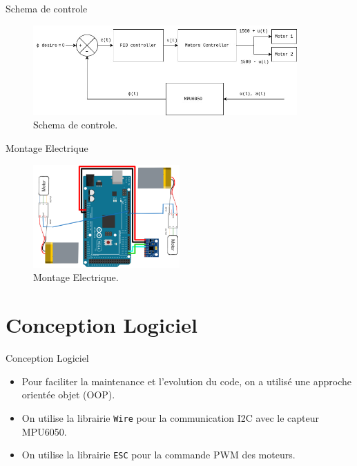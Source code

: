 \documentclass{beamer}
\begin{document}
\begin{frame}{Schema de controle}
	\begin{figure}
		\centering
		\includegraphics[width=0.9\textwidth]{assets/control.jpg}
		\caption{Schema de controle.}
	\end{figure}
\end{frame}

\begin{frame}{Montage Electrique}
	\begin{figure}
		\centering
		\includegraphics[width=0.5\textwidth]{assets/final-circuit.png}
		\caption{Montage Electrique.}
	\end{figure}
\end{frame}

\section{Conception Logiciel}

\begin{frame}{Conception Logiciel}
	\begin{itemize}
		\item Pour faciliter la maintenance et l'evolution du code, on a utilisé une approche orientée objet (OOP).
		\item On utilise la librairie \texttt{Wire} pour la communication I2C avec le capteur MPU6050.
		\item On utilise la librairie \texttt{ESC} pour la commande PWM des moteurs.
	\end{itemize}
\end{frame}
\end{document}
